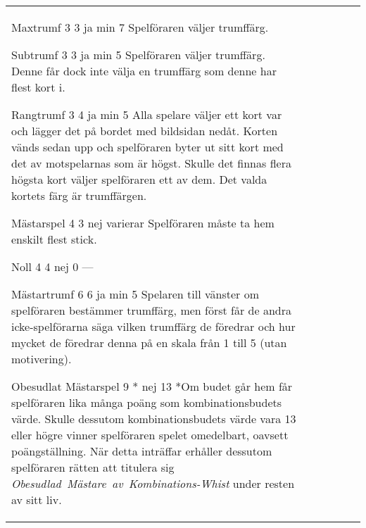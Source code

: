 \begin{center}
\begin{tabularx}{\textwidth}{
			l
			S[table-number-alignment=center, table-format=1.0]
			S[table-number-alignment=center, table-format=1.0]
			cc|X
		}
				\standardBidItem%
				{Maxtrumf}
				{3}
				{3}
				{ja}
				{min 7}
				{%
					Spelföraren väljer trumffärg.
				}

				\standardBidItem%
				{Subtrumf}
				{3}
				{3}
				{ja}
				{min 5}
				{%
					Spelföraren väljer trumffärg. Denne får dock inte välja en trumffärg som denne har flest kort i.
				}

				\standardBidItem%
				{Rangtrumf}
				{3}
				{4}
				{ja}
				{min 5}
				{%
					Alla spelare väljer ett kort var och lägger det på bordet med bildsidan nedåt. Korten vänds sedan upp och spelföraren byter ut sitt kort med det av motspelarnas som är högst. Skulle det finnas flera högsta kort väljer spelföraren ett av dem. Det valda kortets färg är trumffärgen.
				}

				\standardBidItem%
				{Mästarspel}
				{4}
				{3}
				{nej}
				{varierar}
				{%
					Spelföraren måste ta hem enskilt flest stick.
				}

				\standardBidItem%
				{Noll}
				{4}
				{4}
				{nej}
				{0}
				{%
					---
				}

				\standardBidItem%
				{Mästartrumf}
				{6}
				{6}
				{ja}
				{min 5}
				{%
					Spelaren till vänster om spelföraren bestämmer trumffärg, men först får de andra icke-spelförarna säga vilken trumffärg de föredrar och hur mycket de föredrar denna på en skala från 1 till 5 (utan motivering).
				}

				\standardBidItem%
				{Obesudlat Mästarspel}
				{9}
				{*}
				{nej}
				{13}
				{%
					*Om budet går hem får spelföraren lika många poäng som kombinationsbudets värde. Skulle dessutom kombinationsbudets värde vara 13 eller högre vinner spelföraren spelet omedelbart, oavsett poängställning. När detta inträffar erhåller dessutom spelföraren rätten att titulera sig \emph{Obesudlad~Mästare~av~Kombinations-Whist} under resten av sitt liv.
				}
		\end{tabularx}
	\end{center}
